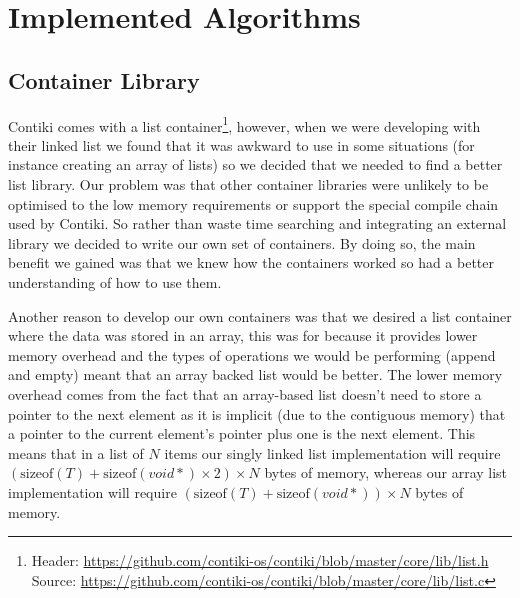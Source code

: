 \section{Implemented Algorithms}


\subsection{Container Library}

Contiki comes with a list container\footnote{Header: \url{https://github.com/contiki-os/contiki/blob/master/core/lib/list.h} Source: \url{https://github.com/contiki-os/contiki/blob/master/core/lib/list.c}}, however, when we were developing with their linked list we found that it was awkward to use in some situations (for instance creating an array of lists) so we decided that we needed to find a better list library. Our problem was that other container libraries were unlikely to be optimised to the low memory requirements or support the special compile chain used by Contiki. So rather than waste time searching and integrating an external library we decided to write our own set of containers. By doing so, the main benefit we gained was that we knew how the containers worked so had a better understanding of how to use them.

Another reason to develop our own containers was that we desired a list container where the data was stored in an array, this was for because it provides lower memory overhead and the types of operations we would be performing (append and empty) meant that an array backed list would be better. The lower memory overhead comes from the fact that an array-based list doesn't need to store a pointer to the next element as it is implicit (due to the contiguous memory) that a pointer to the current element's pointer plus one is the next element. This means that in a list of $N$ items our singly linked list implementation will require $(\text{sizeof}(T) + \text{sizeof}(void *) \times 2) \times N$ bytes of memory, whereas our array list implementation will require $(\text{sizeof}(T) + \text{sizeof}(void *)) \times N$ bytes of memory.

